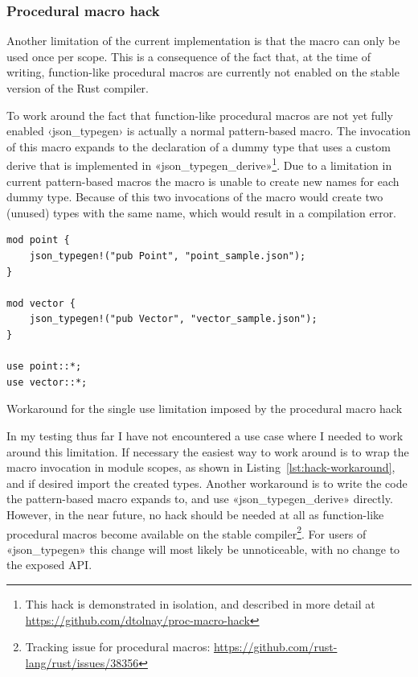 
\subsubsection{Procedural macro hack}

Another limitation of the current implementation is that the macro can only be used once per scope. This is a consequence of the fact that, at the time of writing, function-like procedural macros are currently not enabled on the stable version of the Rust compiler.

To work around the fact that function-like procedural macros are not yet fully enabled ‹json_typegen› is actually a normal pattern-based macro. The invocation of this macro expands to the declaration of a dummy type that uses a custom derive that is implemented in «json_typegen_derive»\footnote{This hack is demonstrated in isolation, and described in more detail at \url{https://github.com/dtolnay/proc-macro-hack}}. Due to a limitation in current pattern-based macros the macro is unable to create new names for each dummy type. Because of this two invocations of the macro would create two (unused) types with the same name, which would result in a compilation error.

\begin{listing}[ht!]
\begin{verbatim}
mod point {
    json_typegen!("pub Point", "point_sample.json");
}

mod vector {
    json_typegen!("pub Vector", "vector_sample.json");
}

use point::*;
use vector::*;
\end{verbatim}
\caption{Workaround for the single use limitation imposed by the procedural macro hack}
\label{lst:hack-workaround}
\end{listing}

In my testing thus far I have not encountered a use case where I needed to work around this limitation. If necessary the easiest way to work around is to wrap the macro invocation in module scopes, as shown in Listing~\ref{lst:hack-workaround}, and if desired import the created types. Another workaround is to write the code the pattern-based macro expands to, and use «json_typegen_derive» directly. However, in the near future, no hack should be needed at all as function-like procedural macros become available on the stable compiler\footnote{Tracking issue for procedural macros: \url{https://github.com/rust-lang/rust/issues/38356}}. For users of «json_typegen» this change will most likely be unnoticeable, with no change to the exposed API.

